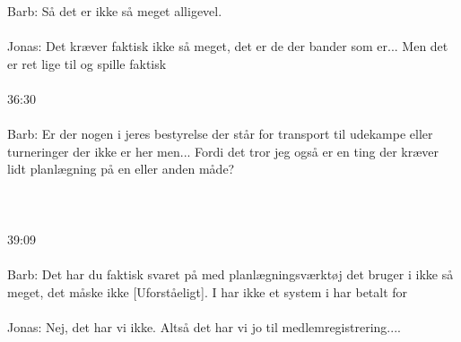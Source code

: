 Barb: Så det er ikke så meget alligevel.
\\\\
Jonas: Det kræver faktisk ikke så meget, det er de der bander som er... Men det er ret lige til og spille faktisk 
\\\\
36:30
\\\\
Barb: Er der nogen i jeres bestyrelse der står for transport til udekampe eller turneringer der ikke er her men... Fordi det tror jeg også er en ting der kræver lidt planlægning på en eller anden måde?
\\\\
\\\\
39:09
\\\\
Barb: Det har du faktisk svaret på med planlægningsværktøj det bruger i ikke så meget, det måske ikke [Uforståeligt]. I har ikke et system i har betalt for
\\\\
Jonas: Nej, det har vi ikke. Altså det har vi jo til medlemregistrering....
